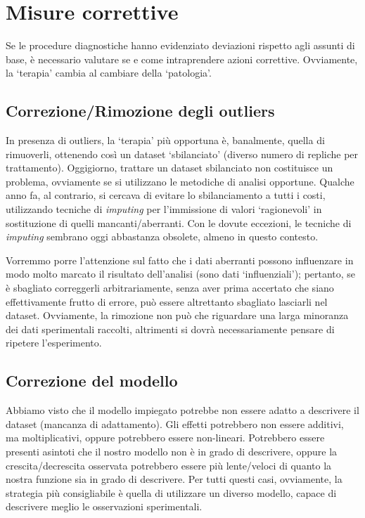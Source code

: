 \documentclass[
  12pt,
]{book}
\begin{document}
\hypertarget{misure-correttive}{%
\section{Misure correttive}\label{misure-correttive}}

Se le procedure diagnostiche hanno evidenziato deviazioni rispetto agli assunti di base, è necessario valutare se e come intraprendere azioni correttive. Ovviamente, la `terapia' cambia al cambiare della `patologia'.

\hypertarget{correzionerimozione-degli-outliers}{%
\subsection{Correzione/Rimozione degli outliers}\label{correzionerimozione-degli-outliers}}

In presenza di outliers, la `terapia' più opportuna è, banalmente, quella di rimuoverli, ottenendo così un dataset `sbilanciato' (diverso numero di repliche per trattamento). Oggigiorno, trattare un dataset sbilanciato non costituisce un problema, ovviamente se si utilizzano le metodiche di analisi opportune. Qualche anno fa, al contrario, si cercava di evitare lo sbilanciamento a tutti i costi, utilizzando tecniche di \emph{imputing} per l'immissione di valori `ragionevoli' in sostituzione di quelli mancanti/aberranti. Con le dovute eccezioni, le tecniche di \emph{imputing} sembrano oggi abbastanza obsolete, almeno in questo contesto.

Vorremmo porre l'attenzione sul fatto che i dati aberranti possono influenzare in modo molto marcato il risultato dell'analisi (sono dati `influenziali'); pertanto, se è sbagliato correggerli arbitrariamente, senza aver prima accertato che siano effettivamente frutto di errore, può essere altrettanto sbagliato lasciarli nel dataset. Ovviamente, la rimozione non può che riguardare una larga minoranza dei dati sperimentali raccolti, altrimenti si dovrà necessariamente pensare di ripetere l'esperimento.

\hypertarget{correzione-del-modello}{%
\subsection{Correzione del modello}\label{correzione-del-modello}}

Abbiamo visto che il modello impiegato potrebbe non essere adatto a descrivere il dataset (mancanza di adattamento). Gli effetti potrebbero non essere additivi, ma moltiplicativi, oppure potrebbero essere non-lineari. Potrebbero essere presenti asintoti che il nostro modello non è in grado di descrivere, oppure la crescita/decrescita osservata potrebbero essere più lente/veloci di quanto la nostra funzione sia in grado di descrivere. Per tutti questi casi, ovviamente, la strategia più consigliabile è quella di utilizzare un diverso modello, capace di descrivere meglio le osservazioni sperimentali.
\end{document}

